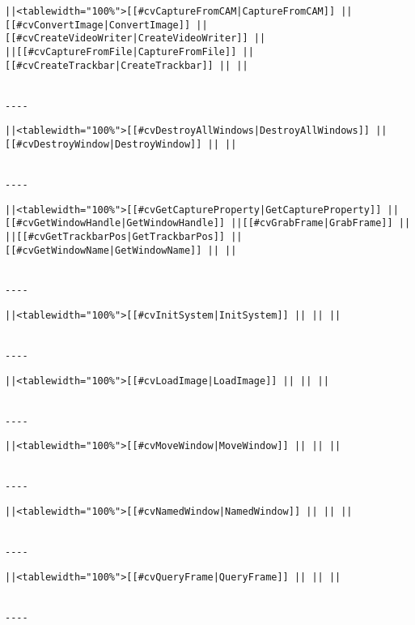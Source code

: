 \begin{verbatim}
||<tablewidth="100%">[[#cvCaptureFromCAM|CaptureFromCAM]] ||[[#cvConvertImage|ConvertImage]] ||[[#cvCreateVideoWriter|CreateVideoWriter]] ||
||[[#cvCaptureFromFile|CaptureFromFile]] ||[[#cvCreateTrackbar|CreateTrackbar]] || ||


----

\end{verbatim}
\begin{verbatim}
||<tablewidth="100%">[[#cvDestroyAllWindows|DestroyAllWindows]] ||[[#cvDestroyWindow|DestroyWindow]] || ||


----

\end{verbatim}
\begin{verbatim}
||<tablewidth="100%">[[#cvGetCaptureProperty|GetCaptureProperty]] ||[[#cvGetWindowHandle|GetWindowHandle]] ||[[#cvGrabFrame|GrabFrame]] ||
||[[#cvGetTrackbarPos|GetTrackbarPos]] ||[[#cvGetWindowName|GetWindowName]] || ||


----

\end{verbatim}
\begin{verbatim}
||<tablewidth="100%">[[#cvInitSystem|InitSystem]] || || ||


----

\end{verbatim}
\begin{verbatim}
||<tablewidth="100%">[[#cvLoadImage|LoadImage]] || || ||


----

\end{verbatim}
\begin{verbatim}
||<tablewidth="100%">[[#cvMoveWindow|MoveWindow]] || || ||


----

\end{verbatim}
\begin{verbatim}
||<tablewidth="100%">[[#cvNamedWindow|NamedWindow]] || || ||


----

\end{verbatim}
\begin{verbatim}
||<tablewidth="100%">[[#cvQueryFrame|QueryFrame]] || || ||


----

\end{verbatim}
